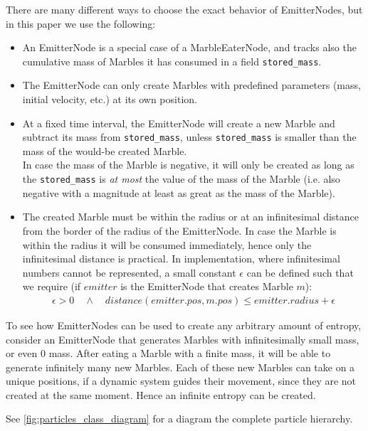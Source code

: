 There are many different ways to choose the exact behavior of EmitterNodes, but in this paper we use the following:
\begin{itemize}
    \item An EmitterNode is a special case of a MarbleEaterNode, and tracks also the cumulative mass of Marbles it has consumed in a field \texttt{stored\_mass}.
    \item The EmitterNode can only create Marbles with predefined parameters (mass, initial velocity, etc.) at its own position.
    \item At a fixed time interval, the EmitterNode will create a new Marble and subtract its mass from \texttt{stored\_mass}, unless \texttt{stored\_mass} is smaller than the mass of the would-be created Marble. \\
    In case the mass of the Marble is negative, it will only be created as long as the \texttt{stored\_mass} is \textit{at most} the value of the mass of the Marble (i.e. also negative with a magnitude at least as great as the mass of the Marble).
    \item The created Marble must be within the radius or at an infinitesimal distance from the border of the radius of the EmitterNode. In case the Marble is within the radius it will be consumed immediately, hence only the infinitesimal distance is practical. In implementation, where infinitesimal numbers cannot be represented, a small constant $\epsilon$ can be defined such that we require (if $emitter$ is the EmitterNode that creates Marble $m$):
    \begin{align}
        \epsilon > 0 \quad \land \quad distance(emitter.pos, m.pos) \leq emitter.radius + \epsilon
    \end{align}
\end{itemize}

To see how EmitterNodes can be used to create any arbitrary amount of entropy, consider an EmitterNode that generates Marbles with infinitesimally small mass, or even 0 mass. After eating a Marble with a finite mass, it will be able to generate infinitely many new Marbles. Each of these new Marbles can take on a unique positions, if a dynamic system guides their movement, since they are not created at the same moment. Hence an infinite entropy can be created.

See \ref{fig:particles_class_diagram} for a diagram the complete particle hierarchy. 

